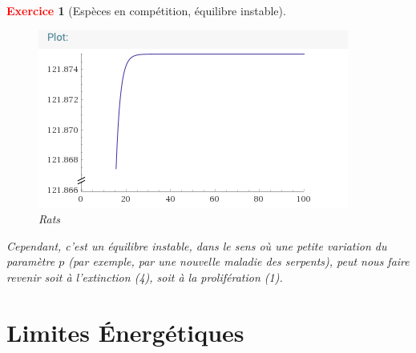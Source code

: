 \documentclass[11pt]{article}
\theoremstyle{mythmstyle}
\newtheorem{exo}{\textcolor{red}{\textbf{Exercice}}}
\begin{document}
\begin{exo}[Espèces en compétition, équilibre instable]
\begin{enumerate}
\begin{enumerate}
\begin{solution}
        \begin{figure}[H]
        \begin{center}
         \includegraphics[scale=0.5]{ratsp0125.png}
        \caption{Rats}
        \end{center}
        \end{figure}
    
    
    Cependant, c'est un équilibre instable, dans le sens où une petite variation du paramètre $p$ (par exemple, par une nouvelle maladie des serpents), peut nous faire revenir soit à l'extinction (4), soit à la prolifération (1). 
\end{solution}
\end{enumerate}
\end{enumerate}
\end{exo}
 
 
\section{Limites Énergétiques}
\end{document}
